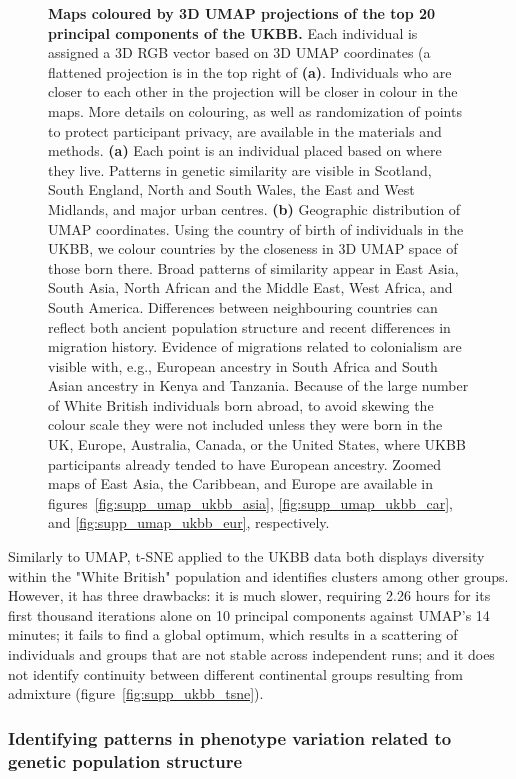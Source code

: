 \documentclass[12pt]{pnas-new}
\begin{document}
\begin{figure}[h!]
  \caption{\textbf{Maps coloured by 3D UMAP projections of the top 20 principal components of the UKBB.} Each individual is assigned a 3D RGB vector based on 3D UMAP coordinates (a flattened projection is in the top right of \textbf{(a)}. Individuals who are closer to each other in the projection will be closer in colour in the maps. More details on colouring, as well as randomization of points to protect participant privacy, are available in the materials and methods. \textbf{(a)} Each point is an individual placed based on where they live. Patterns in genetic similarity are visible in Scotland, South England, North and South Wales, the East and West Midlands, and major urban centres. \textbf{(b)} Geographic distribution of UMAP coordinates. Using the country of birth of individuals in the UKBB, we colour countries by the closeness in 3D UMAP space of those born there. Broad patterns of similarity appear in East Asia, South Asia, North African and the Middle East, West Africa, and South America. Differences between neighbouring countries can reflect both ancient population structure and recent differences in migration history. Evidence of migrations related to colonialism are visible with, e.g., European ancestry in South Africa and South Asian ancestry in Kenya and Tanzania. Because of the large number of White British individuals born abroad, to avoid skewing the colour scale they were not included unless they were born in the UK, Europe, Australia, Canada, or the United States, where UKBB participants already tended to have European ancestry. Zoomed maps of East Asia, the Caribbean, and Europe are available in figures~\ref{fig:supp_umap_ukbb_asia}, \ref{fig:supp_umap_ukbb_car}, and \ref{fig:supp_umap_ukbb_eur}, respectively.}
\end{figure}

Similarly to UMAP, t-SNE applied to the UKBB data both displays diversity within the "White British" population and identifies clusters among other groups. However, it has three drawbacks: it is much slower, requiring 2.26 hours for its first thousand iterations alone on 10 principal components against UMAP's 14 minutes; it fails to find a global optimum, which results in a scattering of individuals and groups that are not stable across independent runs; and it does not identify continuity between different continental groups resulting from admixture (figure~\ref{fig:supp_ukbb_tsne}). 

\subsubsection*{Identifying patterns in phenotype variation related to genetic population structure} 
\end{document}
